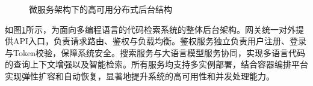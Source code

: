 \documentclass[UTF8,a4paper,12pt]{ctexart}
\numberwithin{equation}{section}
\begin{document}
\begin{figure}[H]
	\caption{微服务架构下的高可用分布式后台结构}
	\label{microservice_arch}
\end{figure}
如图\ref{microservice_arch}所示，为面向多编程语言的代码检索系统的整体后台架构。网关统一对外提供API入口，负责请求路由、鉴权与负载均衡。鉴权服务独立负责用户注册、登录与Token校验，保障系统安全。搜索服务与大语言模型服务协同，实现多语言代码的查询上下文增强以及智能检索。所有服务均支持多实例部署，结合容器编排平台实现弹性扩容和自动恢复，显著地提升系统的高可用性和并发处理能力。\par
\end{document}
